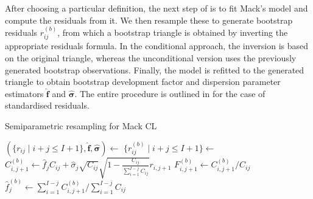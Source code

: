 \documentclass[a4paper]{book}
\begin{document}
After choosing a particular definition, the next step of is to fit Mack's model and compute the residuals from it. We then resample these to generate bootstrap residuals $r^{(b)}_{ij}$, from which a bootstrap triangle is obtained by inverting the appropriate residuals formula. In the conditional approach, the inversion is based on the original triangle, whereas the unconditional version uses the previously generated bootstrap observations. Finally, the model is refitted to the generated triangle to obtain bootstrap development factor and dispersion parameter estimators $\widehat{\bm{f}}$ and $\widehat{\bm{\sigma}}$. The entire procedure is outlined in  for the case of standardised residuals.

\begin{algorithm}
  \caption{Semiparametric resampling for Mack CL} 
  \label{alg:semiparam-mack}
  \begin{algorithmic} 
    \vspace{5pt}
    \State $(\{ r_{ij} \mid i + j \leq I + 1 \}, \bm{\widehat{f}}, \bm{\widehat{\sigma}}) \gets$  
    \vspace{5pt}
        \vspace{5pt}
        \State $\{ r^{(b)}_{ij} \mid i + j \leq I + 1 \} \gets$ 
        \vspace{5pt}
          \vspace{5pt}
              \vspace{5pt}
              \State $C^{(b)}_{i, j + 1} \gets \widehat{f}_j C_{ij} + \widehat{\sigma}_j \sqrt{C_{ij}} \sqrt{1 - \frac{{C_{ij}}}{\sum_{i = 1}^{I - j} C_{ij}}} r_{i, j + 1}$
              \vspace{5pt}
              \State $\displaystyle F^{(b)}_{i, j + 1} \gets C^{(b)}_{i, j + 1} / C_{ij}$
              \vspace{5pt}
            \EndFor
            \vspace{5pt}
            \State $\widehat{f}^{(b)}_j \gets \sum_{i = 1}^{I - j} C^{(b)}_{i, j + 1} / \sum_{i = 1}^{I - j} C_{ij}$
            \vspace{5pt}
              \vspace{5pt}

\end{algorithmic}
\end{algorithm}
\end{document}

